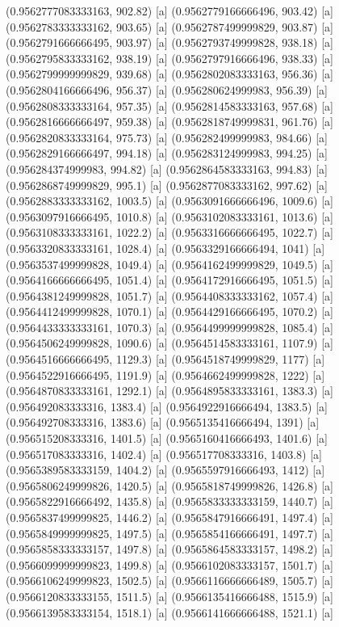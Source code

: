 {{{(0.9562777083333163, 902.82) [a] 
(0.9562779166666496, 903.42) [a] 
(0.9562783333333162, 903.65) [a] 
(0.9562787499999829, 903.87) [a] 
(0.9562791666666495, 903.97) [a] 
(0.9562793749999828, 938.18) [a] 
(0.9562795833333162, 938.19) [a] 
(0.9562797916666496, 938.33) [a] 
(0.9562799999999829, 939.68) [a] 
(0.9562802083333163, 956.36) [a] 
(0.9562804166666496, 956.37) [a] 
(0.956280624999983, 956.39) [a] 
(0.9562808333333164, 957.35) [a] 
(0.9562814583333163, 957.68) [a] 
(0.9562816666666497, 959.38) [a] 
(0.9562818749999831, 961.76) [a] 
(0.9562820833333164, 975.73) [a] 
(0.956282499999983, 984.66) [a] 
(0.9562829166666497, 994.18) [a] 
(0.956283124999983, 994.25) [a] 
(0.956284374999983, 994.82) [a] 
(0.9562864583333163, 994.83) [a] 
(0.9562868749999829, 995.1) [a] 
(0.9562877083333162, 997.62) [a] 
(0.9562883333333162, 1003.5) [a] 
(0.9563091666666496, 1009.6) [a] 
(0.9563097916666495, 1010.8) [a] 
(0.9563102083333161, 1013.6) [a] 
(0.9563108333333161, 1022.2) [a] 
(0.9563316666666495, 1022.7) [a] 
(0.9563320833333161, 1028.4) [a] 
(0.9563329166666494, 1041) [a] 
(0.9563537499999828, 1049.4) [a] 
(0.9564162499999829, 1049.5) [a] 
(0.9564166666666495, 1051.4) [a] 
(0.9564172916666495, 1051.5) [a] 
(0.9564381249999828, 1051.7) [a] 
(0.9564408333333162, 1057.4) [a] 
(0.9564412499999828, 1070.1) [a] 
(0.9564429166666495, 1070.2) [a] 
(0.9564433333333161, 1070.3) [a] 
(0.9564499999999828, 1085.4) [a] 
(0.9564506249999828, 1090.6) [a] 
(0.9564514583333161, 1107.9) [a] 
(0.9564516666666495, 1129.3) [a] 
(0.9564518749999829, 1177) [a] 
(0.9564522916666495, 1191.9) [a] 
(0.9564662499999828, 1222) [a] 
(0.9564870833333161, 1292.1) [a] 
(0.9564895833333161, 1383.3) [a] 
(0.956492083333316, 1383.4) [a] 
(0.9564922916666494, 1383.5) [a] 
(0.956492708333316, 1383.6) [a] 
(0.9565135416666494, 1391) [a] 
(0.956515208333316, 1401.5) [a] 
(0.9565160416666493, 1401.6) [a] 
(0.956517083333316, 1402.4) [a] 
(0.956517708333316, 1403.8) [a] 
(0.9565389583333159, 1404.2) [a] 
(0.9565597916666493, 1412) [a] 
(0.9565806249999826, 1420.5) [a] 
(0.9565818749999826, 1426.8) [a] 
(0.9565822916666492, 1435.8) [a] 
(0.9565833333333159, 1440.7) [a] 
(0.9565837499999825, 1446.2) [a] 
(0.9565847916666491, 1497.4) [a] 
(0.9565849999999825, 1497.5) [a] 
(0.9565854166666491, 1497.7) [a] 
(0.9565858333333157, 1497.8) [a] 
(0.9565864583333157, 1498.2) [a] 
(0.9566099999999823, 1499.8) [a] 
(0.9566102083333157, 1501.7) [a] 
(0.9566106249999823, 1502.5) [a] 
(0.9566116666666489, 1505.7) [a] 
(0.9566120833333155, 1511.5) [a] 
(0.9566135416666488, 1515.9) [a] 
(0.9566139583333154, 1518.1) [a] 
(0.9566141666666488, 1521.1) [a] 
}}}
